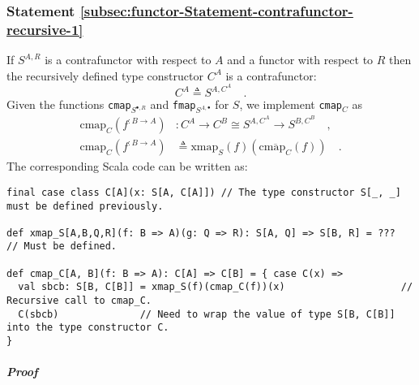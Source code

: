\subsubsection{Statement \label{subsec:functor-Statement-contrafunctor-recursive-1}\ref{subsec:functor-Statement-contrafunctor-recursive-1}}

If $S^{A,R}$ is a contrafunctor with respect to $A$ and a functor
with respect to $R$ then the recursively defined type constructor
$C^{A}$ is a contrafunctor:
\[
C^{A}\triangleq S^{A,C^{A}}\quad.
\]
Given the functions \lstinline!cmap!$_{S^{\bullet,R}}$ and \lstinline!fmap!$_{S^{A,\bullet}}$
for $S$, we implement \lstinline!cmap!$_{C}$ as
\begin{align*}
\text{cmap}_{C}(f^{:B\rightarrow A}) & :C^{A}\rightarrow C^{B}\cong S^{A,C^{A}}\rightarrow S^{B,C^{B}}\quad,\\
\text{cmap}_{C}(f^{:B\rightarrow A}) & \triangleq\text{xmap}_{S}(f)(\overline{\text{cmap}_{C}}(f))\quad.
\end{align*}
The corresponding Scala code can be written as:
\begin{lstlisting}
final case class C[A](x: S[A, C[A]]) // The type constructor S[_, _] must be defined previously.

def xmap_S[A,B,Q,R](f: B => A)(g: Q => R): S[A, Q] => S[B, R] = ???          // Must be defined.

def cmap_C[A, B](f: B => A): C[A] => C[B] = { case C(x) =>
  val sbcb: S[B, C[B]] = xmap_S(f)(cmap_C(f))(x)                    // Recursive call to cmap_C.
  C(sbcb)              // Need to wrap the value of type S[B, C[B]] into the type constructor C.
}
\end{lstlisting}


\subparagraph{Proof}

